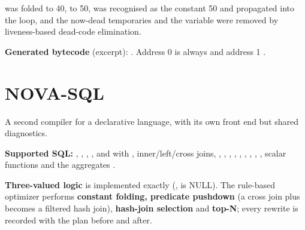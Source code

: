 \documentclass[11pt,a4paper]{article}
\begin{document}
\begin{aim}
 was folded to 40,  to 50,  was recognised as the constant 50 and propagated into the loop, and the now-dead temporaries and the  variable were removed by liveness-based dead-code elimination.
\end{aim}
\textbf{Generated bytecode} (excerpt): . Address 0 is always  and address 1 .

\section{NOVA-SQL}
A second compiler for a declarative language, with its own front end but shared diagnostics.
\begin{center}
\end{center}
\textbf{Supported SQL:} , , , , and  with , inner/left/cross joins, , , , , , , , , , scalar functions and the aggregates .

\textbf{Three-valued logic} is implemented exactly (,  is NULL). The rule-based optimizer performs \textbf{constant folding, predicate pushdown} (a cross join plus  becomes a filtered hash join), \textbf{hash-join selection} and \textbf{top-N}; every rewrite is recorded with the plan before and after.
\end{document}

